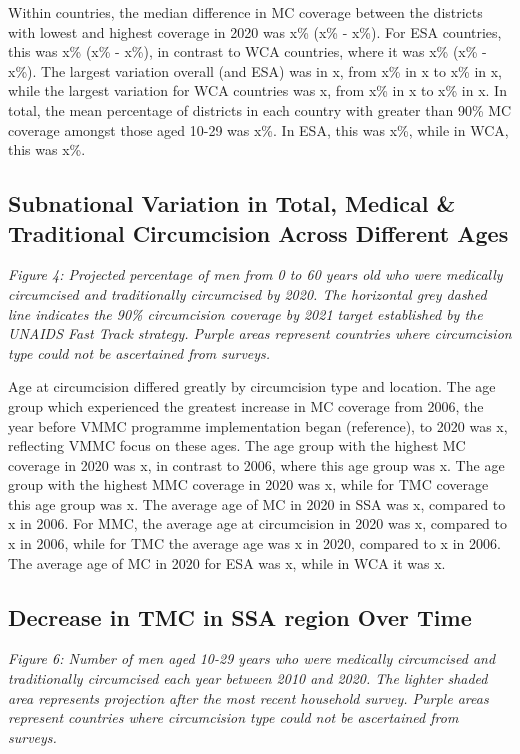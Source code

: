 \documentclass[a4paper, 12pt]{article}
\begin{document}
Within countries, the median difference in MC coverage between the districts with lowest and highest coverage in 2020 was x\% (x\% - x\%).
For ESA countries, this was x\% (x\% - x\%), in contrast to WCA countries, where it was x\% (x\% - x\%).
The largest variation overall (and ESA) was in x, from x\% in x to x\% in x, while the largest variation for WCA countries was x, from x\% in x to x\% in x. 
In total, the mean percentage of districts in each country with greater than 90\% MC coverage amongst those aged 10-29 was x\%. In ESA, this was x\%, while in WCA, this was x\%. 

\subsection{Subnational Variation in Total, Medical \& Traditional Circumcision Across Different Ages}
\label{sec:org92e0f37}

\emph{Figure 4: Projected percentage of men from 0 to 60 years old who were medically circumcised and traditionally circumcised by 2020. The horizontal grey dashed line indicates the 90\% circumcision coverage by 2021 target established by the UNAIDS Fast Track strategy. Purple areas represent countries where circumcision type could not be ascertained from surveys.}

Age at circumcision differed greatly by circumcision type and location. 
The age group which experienced the greatest increase in MC coverage from 2006, the year before VMMC programme implementation began (reference), to 2020 was x, reflecting VMMC focus on these ages. 
The age group with the highest MC coverage in 2020 was x, in contrast to 2006, where this age group was x. 
The age group with the highest MMC coverage in 2020 was x, while for TMC coverage this age group was x. 
The average age of MC in 2020 in SSA was x, compared to x in 2006. 
For MMC, the average age at circumcision in 2020 was x, compared to x in 2006, while for TMC the average age was x in 2020, compared to x in 2006. 
The average age of MC in 2020 for ESA was x, while in WCA it was x. 

\subsection{Decrease in TMC in SSA region Over Time}
\label{sec:org5fb5e18}
\emph{Figure 6: Number of men aged 10-29 years who were medically circumcised and traditionally circumcised each year between 2010 and 2020. The lighter shaded area represents projection after the most recent household survey. Purple areas represent countries where circumcision type could not be ascertained from surveys.}
\end{document}

